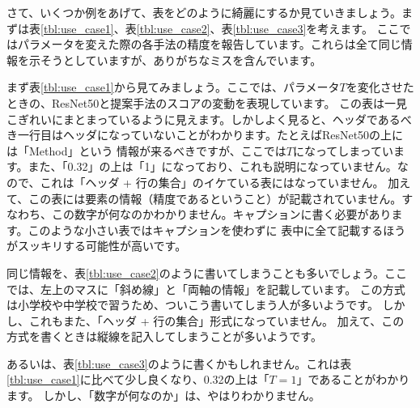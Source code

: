 \documentclass[uplatex,onecolumn,9pt,dvipdfmx]{jsarticle}
\newcommand{\Tref}[1]{表\ref{#1}}
\begin{document}
さて、いくつか例をあげて、表をどのように綺麗にするか見ていきましょう。まずは\Tref{tbl:use_case1}、\Tref{tbl:use_case2}、\Tref{tbl:use_case3}を考えます。
ここではパラメータを変えた際の各手法の精度を報告しています。これらは全て同じ情報を示そうとしていますが、ありがちなミスを含んでいます。

まず\Tref{tbl:use_case1}から見てみましょう。ここでは、パラメータ$T$を変化させたときの、ResNet50と提案手法のスコアの変動を表現しています。
この表は一見こぎれいにまとまっているように見えます。しかしよく見ると、ヘッダであるべき一行目はヘッダになっていないことがわかります。たとえばResNet50の上には「Method」という
情報が来るべきですが、ここでは$T$になってしまっています。また、「0.32」の上は「1」になっており、これも説明になっていません。なので、これは「ヘッダ + 行の集合」のイケている表にはなっていません。
加えて、この表には要素の情報（精度であるということ）が記載されていません。すなわち、この数字が何なのかわかりません。キャプションに書く必要があります。このような小さい表ではキャプションを使わずに
表中に全て記載するほうがスッキリする可能性が高いです。

同じ情報を、\Tref{tbl:use_case2}のように書いてしまうことも多いでしょう。ここでは、左上のマスに「斜め線」と「両軸の情報」を記載しています。
この方式は小学校や中学校で習うため、ついこう書いてしまう人が多いようです。
しかし、これもまた、「ヘッダ + 行の集合」形式になっていません。
加えて、この方式を書くときは縦線を記入してしまうことが多いようです。

あるいは、\Tref{tbl:use_case3}のように書くかもしれません。これは\Tref{tbl:use_case1}に比べて少し良くなり、0.32の上は「$T=1$」であることがわかります。
しかし、「数字が何なのか」は、やはりわかりません。
\end{document}
